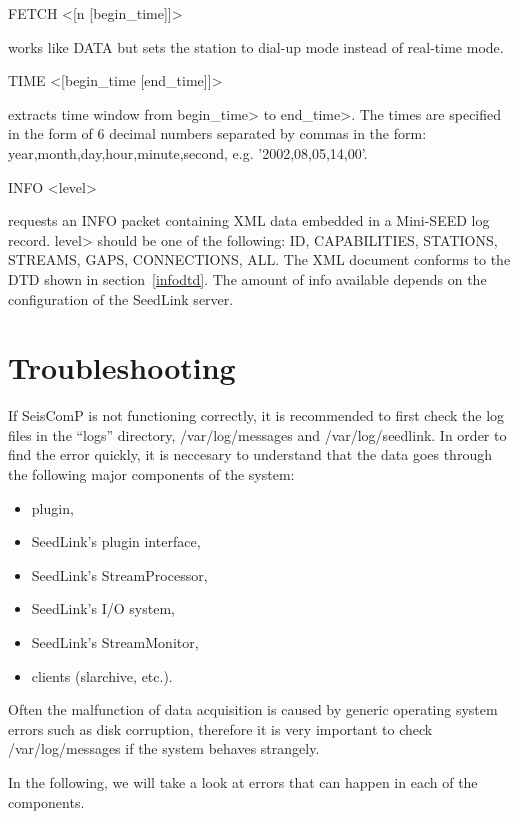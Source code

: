 \documentclass[11pt,a4paper,titlepage]{article}
\begin{document}
\begin{interface}
\item FETCH <[n [begin_time]]>

works like DATA but sets the station to dial-up mode instead of
real-time mode.

\item TIME <[begin_time [end_time]]>

extracts time window from \<begin_time> to \<end_time>.  The times are
specified in the form of 6 decimal numbers separated by commas in the
form: year,month,day,hour,minute,second, e.g. '2002,08,05,14,00'.

\item INFO <level>

requests an INFO packet containing XML data embedded in a Mini-SEED
log record. \<level> should be one of the following: ID, CAPABILITIES,
STATIONS, STREAMS, GAPS, CONNECTIONS, ALL. The XML document conforms
to the DTD shown in section~\ref{infodtd}. The amount of info
available depends on the configuration of the SeedLink server.

\end{interface}


\section{Troubleshooting}

If SeisComP is not functioning correctly, it is recommended to first check
the log files in the ``logs'' directory, /var/log/messages and
/var/log/seedlink.  In order to find the error quickly, it is neccesary to
understand that the data goes through the following major components of the
system:
\begin{itemize}
\item plugin,
\item SeedLink's plugin interface,
\item SeedLink's StreamProcessor,
\item SeedLink's I/O system,
\item SeedLink's StreamMonitor,
\item clients (slarchive, etc.).
\end{itemize}

Often the malfunction of data acquisition is caused by generic operating
system errors such as disk corruption, therefore it is very important to
check /var/log/messages if the system behaves strangely.

In the following, we will take a look at errors that can happen in each of
the components.
\end{document}
